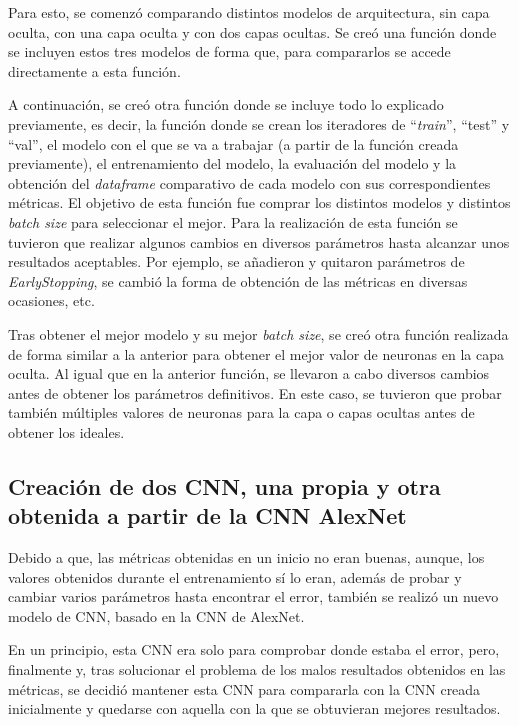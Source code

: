 Para esto, se comenzó comparando distintos modelos de arquitectura, sin capa oculta, con una capa oculta y con dos capas ocultas. Se creó una función donde se incluyen estos tres modelos de forma que, para compararlos se accede directamente a esta función. 

A continuación, se creó otra función donde se incluye todo lo explicado previamente, es decir, la función donde se crean los iteradores de ``\textit{train}'', ``test'' y ``val'', el modelo con el que se va a trabajar (a partir de la función creada previamente), el entrenamiento del modelo, la evaluación del modelo y la obtención del \textit{dataframe} comparativo de cada modelo con sus correspondientes métricas. El objetivo de esta función fue comprar los distintos modelos y distintos \textit{batch size} para seleccionar el mejor. Para la realización de esta función se tuvieron que realizar algunos cambios en diversos parámetros hasta alcanzar unos resultados aceptables. Por ejemplo, se añadieron y quitaron parámetros de \textit{EarlyStopping}, se cambió la forma de obtención de las métricas en diversas ocasiones, etc.

Tras obtener el mejor modelo y su mejor \textit{batch size}, se creó otra función realizada de forma similar a la anterior para obtener el mejor valor de neuronas en la capa oculta. Al igual que en la anterior función, se llevaron a cabo diversos cambios antes de obtener los parámetros definitivos. En este caso, se tuvieron que probar también múltiples valores de neuronas para la capa o capas ocultas antes de obtener los ideales.

\subsection{Creación de dos CNN, una propia y otra obtenida a partir de la CNN AlexNet}

Debido a que, las métricas obtenidas en un inicio no eran buenas, aunque, los valores obtenidos durante el entrenamiento sí lo eran, además de probar y cambiar varios parámetros hasta encontrar el error, también se realizó un nuevo modelo de CNN, basado en la CNN de AlexNet.

En un principio, esta CNN era solo para comprobar donde estaba el error, pero, finalmente y, tras solucionar el problema de los malos resultados obtenidos en las métricas, se decidió mantener esta CNN para compararla con la CNN creada inicialmente y quedarse con aquella con la que se obtuvieran mejores resultados.

